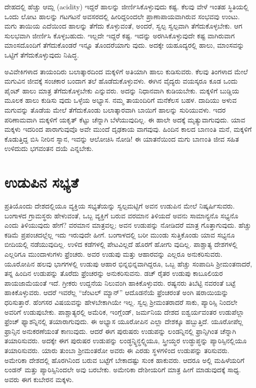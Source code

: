 ದೇಹದಲ್ಲಿ ಹೆಚ್ಚು ಆಮ್ಲ (acidity) ಇದ್ದರೆ ಹಾಲನ್ನು ಜೀರ್ಣಿಸಿಕೊಳ್ಳುವುದು ಕಷ್ಟ. ಕೆಲವು ವೇಳೆ ಇಂತಹ ಸ್ಥಿತಿಯಲ್ಲಿ ಒಂದು ಲೋಟ ಹಾಲನ್ನು ಗಟಗಟನೆ ಅವಸರದಲ್ಲಿ ಹೀರಿದ್ದರಿಂದಲೇ ಪ್ರಾಣಾಪಾಯವಾಗಿರುವ ಸಂಭವವು ಉಂಟು. ಮಗು ತಾಯಿಯ ಎದೆಯಿಂದ ಹಾಲನ್ನು ತೆಗೆದು ಕೊಳ್ಳುವಂತೆ, ಅಂದರೆ, ಸ್ವಲ್ಪ ಸ್ವಲ್ಪವಾಗಿ ತೆಗೆದುಕೊಳ್ಳಬೇಕು. ಆಗ ಸುಲಭವಾಗಿ ಜೀರ್ಣಿಸಿ ಕೊಳ್ಳಬಹುದು. ಇಲ್ಲದೇ ಇದ್ದರೆ ಕಷ್ಟ. ಇದನ್ನು ಅರಗಿಸಿಕೊಳ್ಳುವುದೇ ಕಷ್ಟ ವಾಗಿರುವಾಗ ಮಾಂಸದೊಂದಿಗೆ ತೆಗೆದುಕೊಂಡರೆ ಇನ್ನೂ ತೊಂದರೆಯಾಗು ವುದು. ಅದಕ್ಕೇ ಯಹೂದ್ಯರಲ್ಲಿ ಹಾಲು, ಮಾಂಸವನ್ನು ಒಟ್ಟಿಗೆ ತೆಗೆದುಕೊಳ್ಳುವುದು ನಿಷಿದ್ಧ.

ಅವಿವೇಕಿಗಳಾದ ತಾಯಂದಿರು ಬಲಾತ್ಕಾರದಿಂದ ಮಕ್ಕಳಿಗೆ ಅತಿಯಾಗಿ ಹಾಲು ಕುಡಿಸುವರು. ಕೆಲವು ತಿಂಗಳಾದ ಮೇಲೆ ಮಗುವಿನ ಜೀವಕ್ಕೆ ಸಂಚಕಾರ ಬಂದಾಗ ತಲೆ ಹೊಡೆದುಕೊಳ್ಳುವಳು. ಈಗಿನ ವೈದ್ಯರು ವಯಸ್ಕರೂ ಕೂಡ ಒಂದು ಪೈಂಟ್​ ಹಾಲು ಮಾತ್ರ ತೆಗೆದುಕೊಳ್ಳಬೇಕು ಎನ್ನುವರು. ಅದನ್ನು ನಿಧಾನವಾಗಿ ಕುಡಿಯಬೇಕು. ಮಕ್ಕಳಿಗೆ ಬುಡ್ಡಿಯ ಮೂಲಕ ಹಾಲು ಕುಡಿಸು ವುದು ಒಳ್ಳೆಯ ಅಭ್ಯಾಸ. ನಮ್ಮ ತಾಯಂದಿರಿಗೆ ಮನೆಕೆಲಸ ಬಹಳ. ದಾದಿಯು ಅಳುವ ಮಗುವನ್ನು ತೊಡೆಯ ಮೇಲೆ ತೆಗೆದುಕೊಂಡು ಬಲಾತ್ಕಾರವಾಗಿ ಬಾಯಿಗೆ ಹಾಲನ್ನು ಸುರಿಯುವಳು. ಇದರ ಪರಿಣಾಮವಾಗಿ ಮಕ್ಕಳಿಗೆ ಯಕೃತ್​ ಕೆಟ್ಟು ಚೆನ್ನಾಗಿ ಬೆಳೆಯುವುದಿಲ್ಲ. ಈ ಹಾಲೇ ಅದಕ್ಕೆ ಮೃತ್ಯುವಾಗುವುದು. ಯಾವ ಮಕ್ಕಳು ಇದರಿಂದ ಪಾರಾಗುವುವೊ ಅವೇ ಮುಂದೆ ದೃಢಕಾಯ ವಾಗವುವು. ಹಿಂದಿನ ಕಾಲದ ಬಾಣಂತಿ ಮನೆ, ಮಕ್ಕಳಿಗೆ ಕೊಡುತ್ತಿದ್ದ ಬಿಸಿ ನೀರಿನ ಸ್ನಾನ, ಇವನ್ನು ಆಲೋಚಿಸಿ ನೋಡಿ! ಈ ಯಾತನೆಯಿಂದ ಮಗು ಬಾಣಂತಿ ಜೀವ ಸಹಿತ ಉಳಿದುದು ಭಗವಂತನ ದಯೆ ಎನ್ನಬೇಕು.


\section{ಉಡುಪಿನ ಸಭ್ಯತೆ}

ಪ್ರತಿಯೊಂದು ದೇಶದಲ್ಲಿಯೂ ವ್ಯಕ್ತಿಯ ಸಭ್ಯತೆಯನ್ನು ಸ್ವಲ್ಪಮಟ್ಟಿಗೆ ಅವನ ಉಡುಪಿನ ಮೇಲೆ ನಿಷ್ಕರ್ಷಿಸುವರು. ಬಂಗಾಳದ ಗ್ರಾಮಸ್ಥರು ಹೇಳುವಂತೆ, ಒಬ್ಬ ವ್ಯಕ್ತಿಗೆ ಬರುವ ವರಮಾನ ತಿಳಿಯದೆ ಅವನು ಸಾಮಾನ್ಯನೊ ಸಭ್ಯನೊ ಎಂದು ತಿಳಿಯುವುದು ಹೇಗೆ? ವರಮಾನ ಮಾತ್ರವಲ್ಲ; ಅವನ ಉಡುಪನ್ನು ನೋಡಿದರೆ ಮಾತ್ರ ಗೊತ್ತಾಗುವುದು. ಹೆಚ್ಚು ಕಡಿಮೆ ಪ್ರಪಂಚದಲ್ಲೆಲ್ಲ ಇದು ಇರುವುದೇ ಹೀಗೆ. ಬಂಗಾಳದಲ್ಲಿ ಬರೀ ಮುಂಡು ಸುತ್ತಿಕೊಂಡು ಯಾವ ಸಭ್ಯನೂ ಬೀದಿಯಲ್ಲಿ ನಡೆಯುವುದಿಲ್ಲ. ಉಳಿದ ಕಡೆಗಳಲ್ಲಿ ಪೇಟವಿಲ್ಲದೆ ಹೊರಗೆ ಹೋಗು ವುದಿಲ್ಲ. ಪಾಶ್ಚಾತ್ಯ ದೇಶಗಳಲ್ಲಿ ಎಲ್ಲರಿಗೂ ಮುಂದಾಳುಗಳು ಫ್ರೆಂಚರು. ಅವರ ಉಡುಪು ಮತ್ತು ಆಹಾರವನ್ನು ಎಲ್ಲರೂ ಅನುಕರಿಸುವರು. ಯೂರೋಪಿನ ಹಲವು ಭಾಗಗಳಲ್ಲಿ ಉಡುಪು ಆಹಾರ ಭಿನ್ನಭಿನ್ನವಾಗಿದ್ದರೂ, ಒಬ್ಬ ಹೆಚ್ಚು ಸಂಪಾದಿಸಿ ಶ‍್ರೀಮಂತನಾದರೆ, ತನ್ನ ಹಿಂದಿನ ಉಡುಪನ್ನು ತೊರೆದು ಫ್ರೆಂಚರನ್ನು ಅನುಕರಿಸುವನು. ಡಚ್​ ರೈತರ ಉಡುಪು ಕಾಬೂಲಿಯರ ಪಾಯಜಾಮೆಯಂತೆ ಇದೆ. ಗ್ರೀಕರು ಉದ್ದನೆಯ ನಿಲುವಂಗಿ ಹಾಕಿಕೊಳ್ಳುವರು. ರಷ್ಯನರು ತಿಬೆಟ್ಟಿ ನವರಂತೆ ಬಟ್ಟೆ ಹಾಕಿಕೊಳ್ಳುವರು. ಆದರೆ ಇವರೆಲ್ಲ “ಜೆಂಟಲ್​ ಮ್ಯಾನ್​” ಆದೊಡನೆಯೆ ಫ್ರೆಂಚರಂತೆ ಅಂಗಿ ಷರಾಯಿಯನ್ನು ಧರಿಸುತ್ತಾರೆ. ಹೆಂಗಸರ ವಿಷಯವನ್ನು ಹೇಳಬೇಕಾಗಿಯೇ ಇಲ್ಲ. ಸ್ವಲ್ಪ ಶ‍್ರೀಮಂತರಾದರೆ ಸಾಕು, ಪ್ಯಾರಿಸ್ಸಿ ನಿಂದಲೇ ಅವರಿಗೆ ಉಡುಪುಬೇಕು. ಪಾಶ್ಚಾತ್ಯರಲ್ಲಿ ಅಮೆರಿಕ, ಇಂಗ್ಲೆಂಡ್​, ಜರ್ಮನಿಯ ದೇಶದ ಐಶ್ವರ್ಯವಂತರ ಉಡುಪೆಲ್ಲಾ ಫ್ರೆಂಚ್​ ಫ್ಯಾಶನ್ನಿನಲ್ಲಿ ತಯಾರಾಗುವುದು. ಈ ಅಭ್ಯಾಸ ಯೂರೋಪಿನ ಎಲ್ಲಾ ದೇಶಕ್ಕೂ ಹಬ್ಬುತ್ತಿದೆ. ಯೂರೋಪೆಲ್ಲ ಫ್ರಾನ್ಸಿನ ಅನುಕರಣೆಯಂತೆ ಕಾಣುವುದು. ಆದರೆ ಈಗ ಪುರುಷರು ಉಡುಪನ್ನು ಲಂಡನ್ನಿನಲ್ಲಿ ಫ್ರಾನ್ಸಿಗಿಂತ ಚೆನ್ನಾಗಿ ತಯಾರಿಸುವರು. ಅದಕ್ಕೇ ಈಗ ಪುರುಷರ ಉಡುಪನ್ನು ಲಂಡ್ಧನ್ನ್ಧಿನ್ಧಲ್ಲ್ಧಿಯೂ, ಸ್ತ್ರೀಯ್ಧರ ಉಡ್ಧುಪ್ಧನ್ನು ಪ್ಯಾರಿಸ್ಸಿನಲ್ಲಿಯೂ ತಯಾರಿಸುವರು. ಯಾರು ತುಂಬಾ ಶ‍್ರೀಮಂತರೋ ಅವರು ಈ ಎರಡು ಸ್ಥಳಗಳಿಂದ ಉಡುಪನ್ನು ತರಿಸುವರು. ಅಮೇರಿಕಾ ದೇಶದಲ್ಲಿ ಹೊರಗಿನಿಂದ ಬರುವ ಬಟ್ಟೆಗೆ ಬೇಕಾದಷ್ಟು ಸುಂಕ ಹಾಕುವರು. ಆದರೂ ಅಲ್ಲಿ ಮಹಿಳೆಯರಿಗೆ ಲಂಡನ್​ ಮತ್ತು ಪ್ಯಾರಿಸ್ಸಿನಿಂದಲೇ ಅವು ಬರಬೇಕು. ಅಮೇರಿಕಾ ದೇಶೀಯರಿಗೆ ಮಾತ್ರ ಹೀಗೆ ಮಾಡುವುದಕ್ಕೆ ಸಾಧ್ಯ. ಅವರು ಈಗ ಕುಬೇರನ ಮಕ್ಕಳು.

